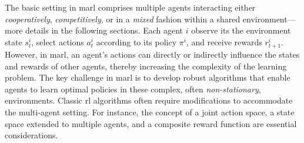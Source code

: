 The basic setting in \ac{marl} comprises multiple agents interacting either \emph{cooperatively}, \emph{competitively}, or in a \emph{mixed} fashion within a shared environment---more details in the following sections. 
 Each agent $i$ observe its the environment state $s_{t}^{i}$, 
 select actions $a_{t}^{i}$ according to its policy $\pi^{i}$, 
 and receive rewards $r_{t+1}^{i}$.
 However, in \ac{marl}, 
 an agent's actions can directly or indirectly influence the states and rewards of other agents, 
 thereby increasing the complexity of the learning problem.
The key challenge in \ac{marl} 
 is to develop robust algorithms that enable agents to learn optimal policies in these complex, 
 often \emph{non-stationary}, environments. 
 Classic \ac{rl} algorithms often require modifications to accommodate the multi-agent setting. 
 For instance, the concept of a joint action space, a state space extended to multiple agents, 
 and a composite reward function are essential considerations.
